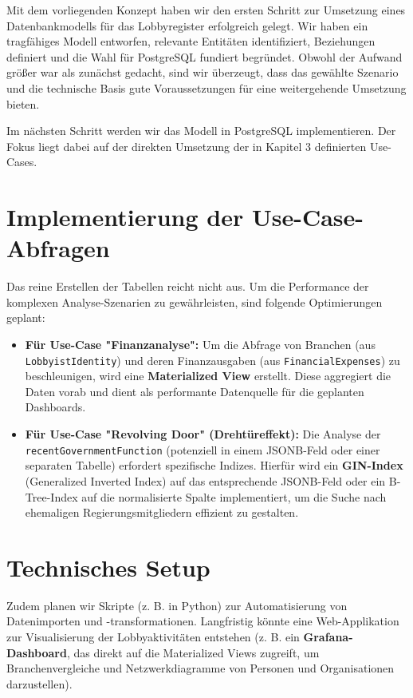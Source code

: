 \documentclass[12pt,twoside=false,a4paper,parskip]{scrbook}
\makeatletter
\renewcommand*{\chapter}{\secdef\@chapter\@schapter}
\makeatother
\begin{document}
\chapter{Fazit}
Mit dem vorliegenden Konzept haben wir den ersten Schritt zur Umsetzung eines Datenbankmodells für das Lobbyregister erfolgreich gelegt. Wir haben ein tragfähiges Modell entworfen, relevante Entitäten identifiziert, Beziehungen definiert und die Wahl für PostgreSQL fundiert begründet. Obwohl der Aufwand größer war als zunächst gedacht, sind wir überzeugt, dass das gewählte Szenario und die technische Basis gute Voraussetzungen für eine weitergehende Umsetzung bieten.
\chapter{Ausblick / Weiteres Vorgehen}

Im nächsten Schritt werden wir das Modell in PostgreSQL implementieren. Der Fokus liegt dabei auf der direkten Umsetzung der in Kapitel 3 definierten Use-Cases.

\section{Implementierung der Use-Case-Abfragen}
Das reine Erstellen der Tabellen reicht nicht aus. Um die Performance der komplexen Analyse-Szenarien zu gewährleisten, sind folgende Optimierungen geplant:

\begin{itemize}
    \item \textbf{Für Use-Case "Finanzanalyse":} Um die Abfrage von Branchen (aus \texttt{LobbyistIdentity}) und deren Finanzausgaben (aus \texttt{FinancialExpenses}) zu beschleunigen, wird eine \textbf{Materialized View} erstellt. Diese aggregiert die Daten vorab und dient als performante Datenquelle für die geplanten Dashboards.

    \item \textbf{Für Use-Case "Revolving Door" (Drehtüreffekt):} Die Analyse der \texttt{recentGovernmentFunction} (potenziell in einem JSONB-Feld oder einer separaten Tabelle) erfordert spezifische Indizes. Hierfür wird ein \textbf{GIN-Index} (Generalized Inverted Index) auf das entsprechende JSONB-Feld oder ein B-Tree-Index auf die normalisierte Spalte implementiert, um die Suche nach ehemaligen Regierungsmitgliedern effizient zu gestalten.
\end{itemize}

\section{Technisches Setup}
Zudem planen wir Skripte (z. B. in Python) zur Automatisierung von Datenimporten und -transformationen. Langfristig könnte eine Web-Applikation zur Visualisierung der Lobbyaktivitäten entstehen (z. B. ein \textbf{Grafana-Dashboard}, das direkt auf die Materialized Views zugreift, um Branchenvergleiche und Netzwerkdiagramme von Personen und Organisationen darzustellen).

\backmatter
\end{document}
